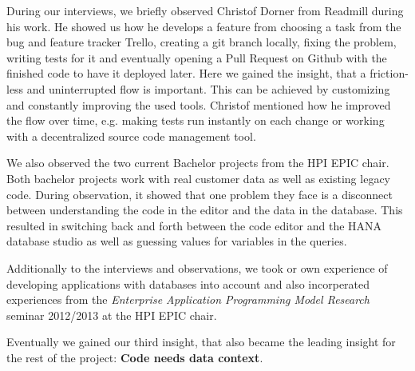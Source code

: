 
During our interviews, we briefly observed Christof Dorner from Readmill during his work. He showed us how he develops a feature from choosing a task from the bug and feature tracker Trello, creating a git branch locally, fixing the problem, writing tests for it and eventually opening a Pull Request on Github with the finished code to have it deployed later. Here we gained the insight, that a friction-less and uninterrupted flow is important. This can be achieved by customizing and constantly improving the used tools. Christof mentioned how he improved the flow over time, e.g. making tests run instantly on each change or working with a decentralized source code management tool.

We also observed the two current Bachelor projects from the HPI EPIC chair. Both bachelor projects work with real customer data as well as existing legacy code. During observation, it showed that one problem they face is a disconnect between understanding the code in the editor and the data in the database. This resulted in switching back and forth between the code editor and the HANA database studio as well as guessing values for variables in the queries.

Additionally to the interviews and observations, we took or own experience of developing applications with databases into account and also incorperated experiences from the \emph{Enterprise Application Programming Model Research} seminar 2012/2013 at the HPI EPIC chair.

Eventually we gained our third insight, that also became the leading insight for the rest of the project: \textbf{Code needs data context}.